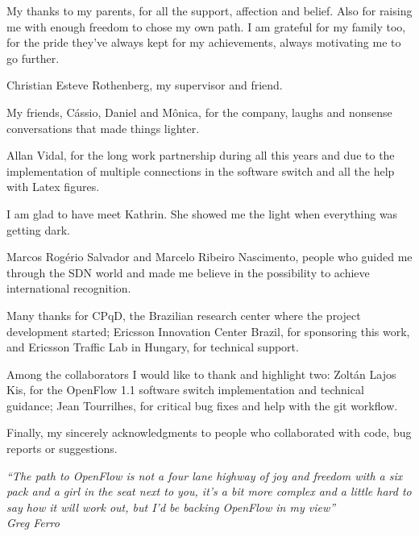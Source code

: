 \begin{agradecimentos}
   
    My thanks to my parents, for all the support, affection and belief. Also for raising me with enough freedom to chose my own path. I am grateful for my family too, for the pride they've always kept for my achievements, always motivating me to go further. 

    Christian Esteve Rothenberg, my supervisor and friend. 

    My friends, C\'{a}ssio, Daniel and M\^{o}nica, for the company, laughs and nonsense conversations that made things lighter. 
    
    Allan Vidal, for the long work partnership during all this years and due to the implementation of multiple connections in the software switch and all the help with Latex figures.

    I am glad to have meet Kathrin. She showed me the light when everything was getting dark.

    Marcos Rog\'{e}rio Salvador and Marcelo Ribeiro Nascimento, people who guided me through the SDN world and made me believe in the possibility to achieve international recognition.
    
    Many thanks for CPqD, the Brazilian research center where the project development started; Ericsson Innovation Center Brazil, for sponsoring this work, and Ericsson Traffic Lab in Hungary, for technical support. 

    Among the collaborators I would like to thank and highlight two: Zoltán Lajos Kis, for the OpenFlow 1.1 software switch implementation and technical guidance; Jean Tourrilhes, for critical bug fixes and help with the git workflow.

    Finally, my sincerely acknowledgments to people who collaborated with code, bug reports or suggestions.
    
    
\end{agradecimentos}

\begin{epigrafe}
    \vspace*{\fill}
	\begin{flushright}
		\textit{``The path to OpenFlow is not a four lane highway of joy and freedom with a six pack and a girl in the seat next to you, it’s a bit more complex and a little hard to say how it will work out, but I’d be backing OpenFlow in my view''\\
		Greg Ferro}
	\end{flushright}
\end{epigrafe}


